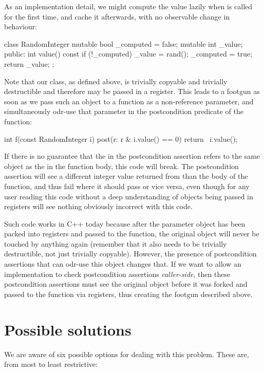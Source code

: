 As an implementation detail, we might compute the value lazily when  is called for the first time, and cache it afterwards, with no observable change in behaviour:
 \begin{codeblock}
class RandomInteger {
  mutable bool _computed = false;
  mutable int  _value;
public:
  int value() const {
    if (!_computed) {
      _value = rand();
      _computed = true;
    }
    return _value;
  }
};
 \end{codeblock}
Note that our  class, as defined above, is trivially copyable and trivially destructible and therefore may be passed in a register. This leads to a footgun as soon as we pass such an object to a function as a non-reference parameter, and simultaneously odr-use that parameter in the postcondition predicate of the function: 
 \begin{codeblock}
int f(const RandomInteger i)
post(r: r & i.value() == 0) {
  return ~i.value();
}
 \end{codeblock}
If there is no guarantee that the  in the postcondition assertion refers to the same object as the  in the function body, this code will break. The postcondition assertion will see a different integer value returned from  than the body of the function, and thus fail where it should pass or vice versa, even though for any user reading this code without a deep understanding of objects being passed in registers will see nothing obviously incorrect with this code.

Such code works in C++ today because after the parameter object has been packed into registers and passed to the function,  the original object will never be touched by anything again (remember that it also needs to be trivially destructible, not just trivially copyable). However, the presence of postcondition assertions that can odr-use this object changes that. If we want to allow an implementation to check postcondition assertions \emph{caller-side}, then these postcondition assertions must see the original object before it was forked and passed to the function via registers, thus creating the footgun described above.

\section{Possible solutions}

We are aware of six possible options for dealing with this problem. These are, from most to least
restrictive:

